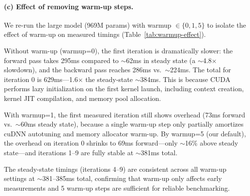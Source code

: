 \documentclass[11pt]{article}
\begin{document}
\paragraph{(c) Effect of removing warm-up steps.}

We re-run the large model (969M params) with warmup $\in \{0, 1, 5\}$
to isolate the effect of warm-up on measured timings (Table~\ref{tab:warmup-effect}).

Without warm-up (warmup=0), the first iteration is dramatically slower:
the forward pass takes 295ms compared to $\sim$62ms in steady state (a $\sim$4.8$\times$ slowdown),
and the backward pass reaches 286ms vs.\ $\sim$224ms.
The total for iteration 0 is 629ms---1.6$\times$ the steady-state $\sim$384ms.
This is because CUDA performs lazy initialization on the first kernel launch, including
context creation, kernel JIT compilation, and memory pool allocation.

With warmup=1, the first measured iteration still shows overhead
(73ms forward vs.\ $\sim$60ms steady state),
because a single warm-up step only partially amortizes cuDNN autotuning and
memory allocator warm-up.
By warmup=5 (our default), the overhead on iteration 0 shrinks to
69ms forward---only $\sim$16\% above steady state---and
iterations 1--9 are fully stable at $\sim$381ms total.

The steady-state timings (iterations 4--9) are consistent across all warm-up settings
at $\sim$381--385ms total, confirming that warm-up only affects early measurements and
5 warm-up steps are sufficient for reliable benchmarking.
\end{document}
